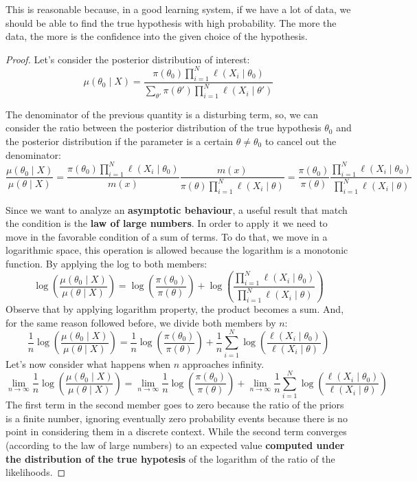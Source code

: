 This is reasonable because, in a good learning system, if we have a lot of data, we should be able to find the true hypothesis with high probability. 
The more the data, the more is the confidence into the given choice of the hypothesis. 

\begin{proof}
    Let's consider the posterior distribution of interest:
    \[
        \mu(\theta_0 \mid X) = \frac{\pi(\theta_0) \prod_{i=1}^N \ell(X_i \mid \theta_0 )}{\sum_{\theta'} \pi(\theta') \prod_{i=1}^N \ell(X_i \mid \theta')}
    \]
    
    The denominator of the previous quantity is a disturbing term, so, we can consider the ratio between the posterior distribution of the true hypothesis $\theta_0$ and the posterior distribution if the parameter is a certain $\theta \neq \theta_0$ to cancel out the denominator:
    \[
        \frac{\mu(\theta_0 \mid X)}{\mu(\theta \mid X)} = \frac{\pi(\theta_0) \prod_{i=1}^N \ell(X_i \mid \theta_0 )}{m(x)} \frac{m(x)}{\pi(\theta) \prod_{i=1}^N \ell(X_i \mid \theta)} = \frac{\pi(\theta_0)}{\pi(\theta)} \frac{\prod_{i=1}^N \ell(X_i \mid \theta_0)}{\prod_{i=1}^N \ell(X_i \mid \theta)}
    \]
    
    Since we want to analyze an \textbf{asymptotic behaviour}, a useful result that match the condition is the \textbf{law of large numbers}. In order to apply it we need to move in the favorable condition of a sum of terms. To do that, we move in a logarithmic space, this operation is allowed because the logarithm is a monotonic function.
    By applying the log to both members:
    \[
        \log \left(\frac{\mu(\theta_0 \mid X)}{\mu(\theta \mid X)}\right) = \log \left(\frac{\pi(\theta_0)}{\pi(\theta)}\right) + \log\left(\frac{\prod_{i=1}^N \ell(X_i \mid \theta_0)}{\prod_{i=1}^N \ell(X_i \mid \theta)}\right)
    \]
    Observe that by applying logarithm property, the product becomes a sum. And, for the same reason followed before, we divide both members by $n$:
    \[
        \frac{1}{n} \log \left(\frac{\mu(\theta_0 \mid X)}{\mu(\theta \mid X)}\right) =\frac{1}{n} \log \left(\frac{\pi(\theta_0)}{\pi(\theta)}\right) + \frac{1}{n} \sum_{i=1}^N \log \left(\frac{\ell(X_i \mid \theta_0)}{ \ell(X_i \mid \theta)}\right)
    \]
    Let's now consider what happens when $n$ approaches infinity.
    \[
        \lim_{n \to \infty} \frac{1}{n} \log \left(\frac{\mu(\theta_0 \mid X)}{\mu(\theta \mid X)}\right) = \lim_{n \to \infty} \frac{1}{n} \log \left(\frac{\pi(\theta_0)}{\pi(\theta)}\right) + \lim_{n \to \infty} \frac{1}{n} \sum_{i=1}^N \log \left(\frac{\ell(X_i \mid \theta_0)}{ \ell(X_i \mid \theta)}\right)
    \]
    The first term in the second member goes to zero because the ratio of the priors is a finite number, ignoring eventually zero probability events because there is no point in considering them in a discrete context.
    While the second term converges (according to the law of large numbers) to an expected value \textbf{computed under the distribution of the true hypotesis} of the logarithm of the ratio of the likelihoods.


\end{proof}
